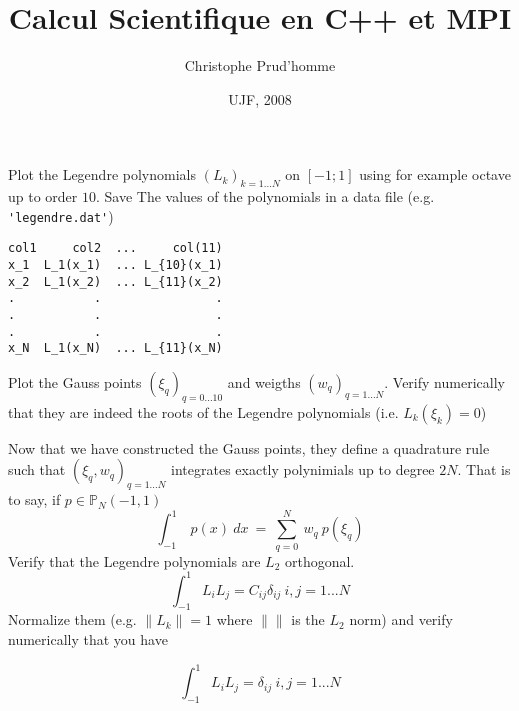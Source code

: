 \documentclass{article}
\title{Calcul Scientifique en C++ et MPI}
\author{Christophe Prud'homme}
\date{UJF, 2008}
\begin{document}
\maketitle



\begin{Exercise}[title={p type Galerkin method in 1D}]
  
  \Question Plot the Legendre polynomials $(L_k)_{k=1...N}$ on
  $[-1;1]$ using for example octave up to order $10$. Save The values
  of the polynomials in a data file (e.g. \verb+'legendre.dat'+)
\begin{verbatim}
col1     col2  ...     col(11)
x_1  L_1(x_1)  ... L_{10}(x_1)
x_2  L_1(x_2)  ... L_{11}(x_2)
.           .                .
.           .                .
.           .                .
x_N  L_1(x_N)  ... L_{11}(x_N)
\end{verbatim}

  \Question Plot the Gauss points $(\xi_q)_{q=0...10}$ and weigths
  $(w_q)_{q=1...N}$. Verify numerically that they are indeed the roots
  of the Legendre polynomials (i.e. $L_k(\xi_k) = 0$)
  
  \Question Now that we have constructed the Gauss points, they define
  a quadrature rule such that $(\xi_q,w_q)_{q=1...N}$ integrates
  exactly polynimials up to degree $2N$. That is to say, if $p \in \mathbb{P}_N(-1,1)$
  \begin{equation}
    \label{eq:1}
    \int_{-1}^1\ p(x)\ dx\ =\ \sum_{q=0}^N\ w_q\ p( \xi_q )
  \end{equation}
  \subQuestion Verify that the Legendre polynomials are $L_2$ orthogonal. 
  \begin{equation}
    \label{eq:3}
    \int_{-1}^1 L_i L_j = C_{ij} \delta_{ij}\ i,j=1...N
  \end{equation}
  \subQuestion Normalize them (e.g. $\|L_k\| = 1$ where $\|\|$ is the
  $L_2$ norm) and verify numerically that you have
  
  \begin{equation}
    \label{eq:2}
    \int_{-1}^1 L_i L_j =  \delta_{ij}\ i,j=1...N
  \end{equation}
  

\end{Exercise}
\end{document}
